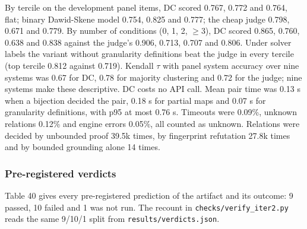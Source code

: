 \documentclass[11pt,letterpaper]{article}
\begin{document}
By tercile on the development panel items, DC scored 0.767, 0.772 and 0.764, flat; binary Dawid-Skene model 0.754, 0.825 and 0.777; the cheap judge 0.798, 0.671 and 0.779. By number of conditions (0, 1, 2, $\geq$3), DC scored 0.865, 0.760, 0.638 and 0.838 against the judge's 0.906, 0.713, 0.707 and 0.806. Under solver labels the variant without granularity definitions beat the judge in every tercile (top tercile 0.812 against 0.719). Kendall $\tau$ with panel system accuracy over nine systems was 0.67 for DC, 0.78 for majority clustering and 0.72 for the judge; nine systems make these descriptive. DC costs no API call. Mean pair time was 0.13 s when a bijection decided the pair, 0.18 s for partial maps and 0.07 s for granularity definitions, with p95 at most 0.76 s. Timeouts were 0.09\%, unknown relations 0.12\% and engine errors 0.05\%, all counted as unknown. Relations were decided by unbounded proof 39.5k times, by fingerprint refutation 27.8k times and by bounded grounding alone 14 times.

\subsubsection{Pre-registered verdicts}

Table 40 gives every pre-registered prediction of the artifact and its outcome: 9 passed, 10 failed and 1 was not run. The recount in \texttt{checks/\allowbreak{}verify\_\allowbreak{}\allowbreak{}iter2.py} reads the same 9/10/1 split from \texttt{results/\allowbreak{}verdicts.json}.
\end{document}
